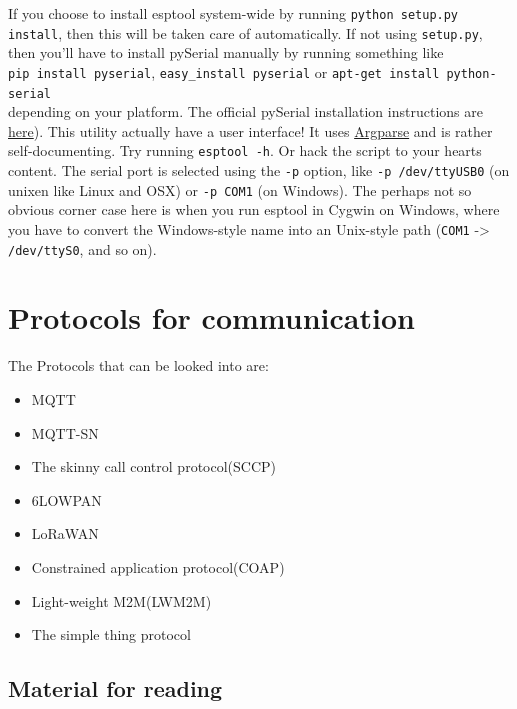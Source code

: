 \documentclass[16pt]{article}
\begin{document}
If you choose to install esptool system-wide by running
\texttt{python setup.py install}, then this will be taken care of
automatically.
If not using \texttt{setup.py}, then you'll have to install pySerial
manually by running something like \\

\texttt{pip install pyserial},
\texttt{easy\_install pyserial} or
\texttt{apt-get install python-serial} \\
\vspace{0.3cm}
depending on your platform. The
official pySerial installation instructions are
\href{http://pyserial.sourceforge.net/pyserial.html\#installation}{here}).
This utility actually have a user interface! It uses
\href{https://docs.python.org/dev/library/argparse.html}{Argparse}
and is rather self-documenting. Try running \texttt{esptool -h}. Or hack the
script to your hearts content. The serial port is selected using the
\texttt{-p} option, like \texttt{-p /dev/ttyUSB0} (on unixen like Linux
and OSX) or \texttt{-p COM1} (on Windows). The perhaps not so obvious
corner case here is when you run esptool in Cygwin on Windows, where you
have to convert the Windows-style name into an Unix-style path
(\texttt{COM1} -\textgreater{} \texttt{/dev/ttyS0}, and so on).

\vspace{9cm}


\section{Protocols for communication}

\vspace{0.5cm}

The Protocols that can be looked into are:

\begin{itemize}

\item
  MQTT
\item
  MQTT-SN
\item
  The skinny call control protocol(SCCP)
\item
  6LOWPAN
\item
  LoRaWAN
\item
  Constrained application protocol(COAP)
\item
  Light-weight M2M(LWM2M)
\item
  The simple thing protocol
\end{itemize}

\subsection{Material for reading}
\end{document}
